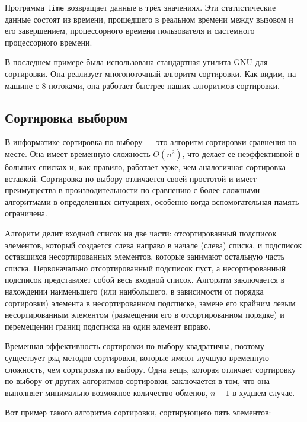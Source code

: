 Программа \verb|time| возвращает данные в трёх значениях.
Эти статистические данные состоят из времени, прошедшего в реальном времени
между вызовом и его завершением, процессорного времени пользователя и системного
процессорного времени.

В последнем примере была использована стандартная утилита GNU для сортировки.
Она реализует многопоточный алгоритм сортировки.
Как видим, на машине с 8 потоками, она работает быстрее наших алгоритмов
сортировки.

\subsection{Сортировка выбором}

В информатике сортировка по выбору --- это алгоритм сортировки сравнения на месте.
Она имеет временную сложность $O(n^2)$, что делает ее неэффективной в больших
списках и, как правило, работает хуже, чем аналогичная сортировка вставкой.
Сортировка по выбору отличается своей простотой и имеет преимущества в
производительности по сравнению с более сложными алгоритмами в определенных
ситуациях, особенно когда вспомогательная память ограничена.

Алгоритм делит входной список на две части: отсортированный подсписок элементов,
который создается слева направо в начале (слева) списка, и подсписок оставшихся
несортированных элементов, которые занимают остальную часть списка.
Первоначально отсортированный подсписок пуст, а несортированный подсписок
представляет собой весь входной список. Алгоритм заключается в нахождении
наименьшего (или наибольшего, в зависимости от порядка сортировки) элемента в
несортированном подсписке, замене его крайним левым несортированным
элементом (размещении его в отсортированном порядке) и перемещении границ
подсписка на один элемент вправо.

Временная эффективность сортировки по выбору квадратична, поэтому существует ряд
методов сортировки, которые имеют лучшую временную сложность, чем сортировка по
выбору. Одна вещь, которая отличает сортировку по выбору от других алгоритмов
сортировки, заключается в том, что она выполняет минимально возможное количество
обменов, $n-1$ в худшем случае.

Вот пример такого алгоритма сортировки, сортирующего пять элементов:


